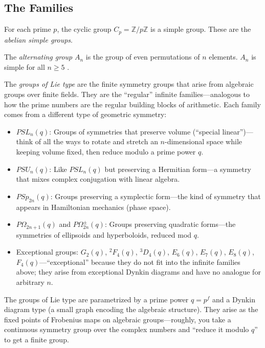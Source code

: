 \subsection{The Families}

\begin{definition}
For each prime $p$, the cyclic group $C_p = \mathbb{Z}/p\mathbb{Z}$ is a simple group. These are the \emph{abelian simple groups}.
\end{definition}

\begin{definition}
The \emph{alternating group} $A_n$ is the group of even permutations of $n$ elements. $A_n$ is simple for all $n \geq 5$ \cite{galois1832}.
\end{definition}

\begin{definition}
The \emph{groups of Lie type} are the finite symmetry groups that arise from algebraic groups over finite fields. They are the ``regular'' infinite families---analogous to how the prime numbers are the regular building blocks of arithmetic. Each family comes from a different type of geometric symmetry:
\begin{itemize}
\item $PSL_n(q)$: Groups of symmetries that preserve volume (``special linear'')---think of all the ways to rotate and stretch an $n$-dimensional space while keeping volume fixed, then reduce modulo a prime power $q$.
\item $PSU_n(q)$: Like $PSL_n(q)$ but preserving a Hermitian form---a symmetry that mixes complex conjugation with linear algebra.
\item $PSp_{2n}(q)$: Groups preserving a symplectic form---the kind of symmetry that appears in Hamiltonian mechanics (phase space).
\item $P\Omega_{2n+1}(q)$ and $P\Omega_{2n}^{\pm}(q)$: Groups preserving quadratic forms---the symmetries of ellipsoids and hyperboloids, reduced mod $q$.
\item Exceptional groups: $G_2(q)$, $^2F_4(q)$, $^3D_4(q)$, $E_6(q)$, $E_7(q)$, $E_8(q)$, $F_4(q)$---``exceptional'' because they do not fit into the infinite families above; they arise from exceptional Dynkin diagrams and have no analogue for arbitrary $n$.
\end{itemize}
\end{definition}

The groups of Lie type are parametrized by a prime power $q = p^f$ and a Dynkin diagram type (a small graph encoding the algebraic structure). They arise as the fixed points of Frobenius maps on algebraic groups---roughly, you take a continuous symmetry group over the complex numbers and ``reduce it modulo $q$'' to get a finite group.

